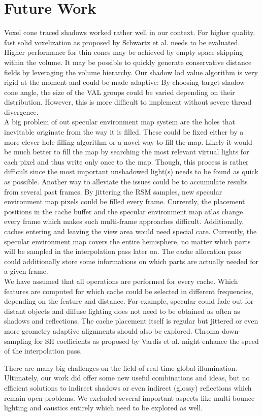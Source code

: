 \documentclass[thesis.tex]{subfiles}
\begin{document}
\section{Future Work}
Voxel cone traced shadows worked rather well in our context.
For higher quality, fast solid voxelization as proposed by Schwartz et al. \cite{bib:solidvoxelization} needs to be evaluated.
Higher performance for thin cones may be achieved by empty space skipping within the volume.
It may be possible to quickly generate conservative distance fields by leveraging the volume hierarchy.
%
Our shadow lod value algorithm is very rigid at the moment and could be made adaptive:
By choosing target shadow cone angle, the size of the VAL groups could be varied depending on their distribution.
However, this is more difficult to implement without severe thread divergence.
%
\\
A big problem of out specular environment map system are the holes that inevitable originate from the way it is filled.
These could be fixed either by a more clever hole filling algorithm or a novel way to fill the map.
Likely it would be much better to fill the map by searching the most relevant virtual lights for each pixel and thus write only once to the map.
Though, this process is rather difficult since the most important unshadowed light(s) needs to be found as quick as possible.
%
Another way to alleviate the issues could be to accumulate results from several past frames.
By jittering the RSM samples, new specular environment map pixels could be filled every frame.
Currently, the placement positions in the cache buffer and the specular environment map atlas change every frame which makes such multi-frame approaches difficult.
Additionally, caches entering and leaving the view area would need special care.
%
Currently, the specular environment map covers the entire hemisphere, no matter which parts will be sampled in the interpolation pass later on.
The cache allocation pass could additionally store some informations on which parts are actually needed for a given frame.
\\
We have assumed that all operations are performed for every cache.
Which features are computed for which cache could be selected in different frequencies, depending on the feature and distance.
For example, specular could fade out for distant objects and diffuse lighting does not need to be obtained as often as shadows and reflections.
%
The cache placement itself is regular but jittered or even more geometry adaptive alignments should also be explored.
%
Chroma down-sampling for SH coefficients as proposed by Vardis et al. \cite{bib:radiancecachechromaticcompression} might enhance the speed of the interpolation pass.

There are many big challenges on the field of real-time global illumination.
Ultimately, our work did offer some new useful combinations and ideas, but no efficient solutions to indirect shadows or even indirect (glossy) reflections which remain open problems.
We excluded several important aspects like multi-bounce lighting and caustics entirely which need to be explored as well.


\subfilebib %
\end{document}
